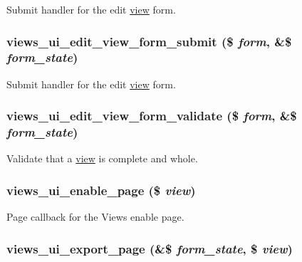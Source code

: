 Submit handler for the edit \hyperlink{classview}{view} form. \hypertarget{admin_8inc_1175fee9669154b7486a7e2fbfc6efae}{
\subsubsection[{views\_\-ui\_\-edit\_\-view\_\-form\_\-submit}]{\setlength{\rightskip}{0pt plus 5cm}views\_\-ui\_\-edit\_\-view\_\-form\_\-submit (\$ {\em form}, \/  \&\$ {\em form\_\-state})}}
\label{admin_8inc_1175fee9669154b7486a7e2fbfc6efae}


Submit handler for the edit \hyperlink{classview}{view} form. \hypertarget{admin_8inc_64c87654d6ff972d3755b11283257766}{
\subsubsection[{views\_\-ui\_\-edit\_\-view\_\-form\_\-validate}]{\setlength{\rightskip}{0pt plus 5cm}views\_\-ui\_\-edit\_\-view\_\-form\_\-validate (\$ {\em form}, \/  \&\$ {\em form\_\-state})}}
\label{admin_8inc_64c87654d6ff972d3755b11283257766}


Validate that a \hyperlink{classview}{view} is complete and whole. \hypertarget{admin_8inc_82465b0f9577f7992268365fc49dee3d}{
\subsubsection[{views\_\-ui\_\-enable\_\-page}]{\setlength{\rightskip}{0pt plus 5cm}views\_\-ui\_\-enable\_\-page (\$ {\em view})}}
\label{admin_8inc_82465b0f9577f7992268365fc49dee3d}


Page callback for the Views enable page. \hypertarget{admin_8inc_24de19609cbac147d353b05d1d0cf54d}{
\subsubsection[{views\_\-ui\_\-export\_\-page}]{\setlength{\rightskip}{0pt plus 5cm}views\_\-ui\_\-export\_\-page (\&\$ {\em form\_\-state}, \/  \$ {\em view})}}
\label{admin_8inc_24de19609cbac147d353b05d1d0cf54d}


